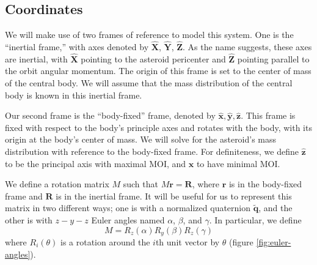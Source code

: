 \documentclass{aastex631}
\newcommand{\unit}[1]{\hat{\bm{#1}}}
\newcommand{\quat}[1]{\widetilde{\bm{#1}}}
\begin{document}
\subsection{Coordinates}
\label{sec:coordinates}
We will make use of two frames of reference to model this system. One is the ``inertial frame,'' with axes denoted by $\unit{X}$, $\unit{Y}$, $\unit{Z}$. As the name suggests, these axes are inertial, with $\unit{X}$ pointing to the asteroid pericenter and $\unit{Z}$ pointing parallel to the orbit angular momentum. The origin of this frame is set to the center of mass of the central body. We will assume that the mass distribution of the central body is known in this inertial frame.

Our second frame is the ``body-fixed'' frame, denoted by $\unit{x}, \unit{y}, \unit{z}$. This frame is fixed with respect to the body's principle axes and rotates with the body, with its origin at the body's center of mass. We will solve for the asteroid's mass distribution with reference to the body-fixed frame. For definiteness, we define $\unit{z}$ to be the principal axis with maximal MOI, and $\unit{x}$ to have minimal MOI.

We define a rotation matrix $M$ such that $M\bm{r} = \bm{R}$, where $\bm{r}$ is in the body-fixed frame and $\bm{R}$ is in the inertial frame. It will be useful for us to represent this matrix in two different ways; one is with a normalized quaternion $\quat q$, and the other is with $z-y-z$ Euler angles named $\alpha$, $\beta$, and $\gamma$. In particular, we define
\begin{equation}
M = R_z(\alpha) R_y(\beta) R_z(\gamma)
\label{eqn:euler-angles}
\end{equation}
where $R_i(\theta)$ is a rotation around the $i$th unit vector by $\theta$ (figure \ref{fig:euler-angles}).
\end{document}
